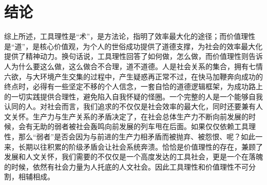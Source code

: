 \section{结论}
综上所述，工具理性是“术”，是方法论，指明了效率最大化的途径；而价值理性是“道”，是核心价值观，为个人的世俗成功提供了道德支撑，为社会的效率最大化提供了精神动力。换句话说，工具理性回答了如何做，怎么做，而价值理性则告诉人为什么要这么做，这么做合不合理，道不道德。人是社会关系的集合，拥有七情六欲，与大环境产生交集的过程中，产生疑惑再正常不过，在快马加鞭奔向成功的终点时，必得有一些坚定不移的个人信念，一套自恰的道德逻辑框架，为成功路上的一切实践提供合理性，避免陷入自我怀疑的怪圈。一个完整的人是一个能够自我认同的人。对社会而言，我们追求的不仅仅是社会效率的最大化，同时还要兼有人文关怀。生产力与生产关系的矛盾决定了，在社会总体生产力不断向前发展的时候，会有无助的弱者被社会轰鸣向前发展的列车甩在后面。如果仅仅依赖工具理性，那么“弱者”是否会因为与前进的生产力相矛盾而被抛弃、被怨恨、呢？如此一来，长期以往积累的阶级矛盾会让社会系统奔溃。恰恰是价值理性的存在，兼顾了发展和人文关怀，我们需要的不仅仅是一个高度发达的工具社会，更是一个在落魄的时候，依然有社会力量为人托底的人文社会。因此工具理性和价值理性不可分割，相辅相成。
